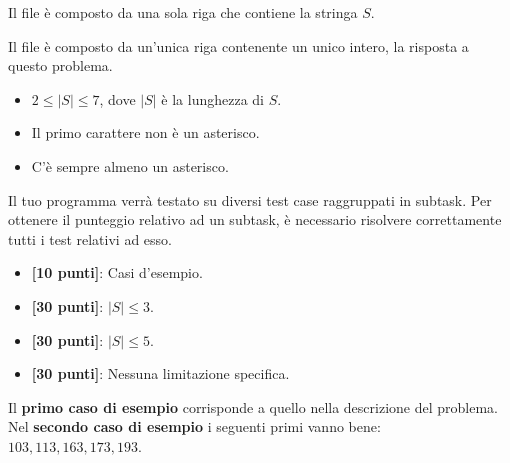 \InputFile
Il file  è composto da una sola riga che contiene la stringa $S$.

\OutputFile
Il file \outputfile{} è composto da un'unica riga contenente un unico intero, la risposta a questo problema.

\Constraints
\begin{itemize}[nolistsep, itemsep=2mm]
  \item $2 \le |S| \le 7$, dove $|S|$ è la lunghezza di $S$.
  \item Il primo carattere non è un asterisco.
  \item C'è sempre almeno un asterisco.
\end{itemize}

\Scoring
Il tuo programma verrà testato su diversi test case raggruppati in subtask.
Per ottenere il punteggio relativo ad un subtask, è necessario risolvere
correttamente tutti i test relativi ad esso.

\begin{itemize}[nolistsep,itemsep=2mm]
  \item \textbf{ [10 punti]}: Casi d'esempio.
  \item \textbf{ [30 punti]}: $|S| \leq 3$.
  \item \textbf{ [30 punti]}: $|S| \leq 5$.
  \item \textbf{ [30 punti]}: Nessuna limitazione specifica.
\end{itemize}



\Examples
\begin{example}
%
%
%
\end{example}


\Explanation
Il \textbf{primo caso di esempio} corrisponde a quello nella descrizione del problema.\\[2mm]
Nel \textbf{secondo caso di esempio} i seguenti primi vanno bene: $103, 113, 163, 173, 193$.
